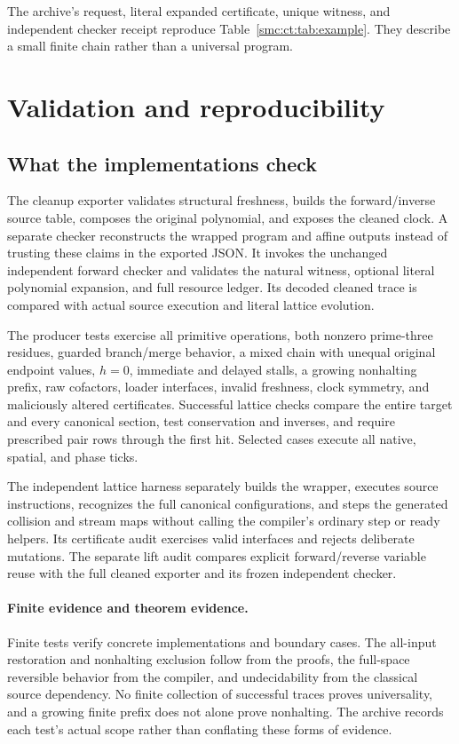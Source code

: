 \documentclass[11pt,letterpaper]{article}
\numberwithin{equation}{section}
\theoremstyle{definition}
\theoremstyle{remark}
\begin{document}
The archive's request, literal expanded certificate, unique witness, and independent checker receipt reproduce Table~\ref{smc:ct:tab:example}. They describe a small finite chain rather than a universal program.

\section{Validation and reproducibility}\label{smc:ct:sec:validation}

\subsection{What the implementations check}

The cleanup exporter validates structural freshness, builds the forward/inverse source table, composes the original polynomial, and exposes the cleaned clock. A separate checker reconstructs the wrapped program and affine outputs instead of trusting these claims in the exported JSON. It invokes the unchanged independent forward checker and validates the natural witness, optional literal polynomial expansion, and full resource ledger. Its decoded cleaned trace is compared with actual source execution and literal lattice evolution.

The producer tests exercise all primitive operations, both nonzero prime-three residues, guarded branch/merge behavior, a mixed chain with unequal original endpoint values, $h=0$, immediate and delayed stalls, a growing nonhalting prefix, raw cofactors, loader interfaces, invalid freshness, clock symmetry, and maliciously altered certificates. Successful lattice checks compare the entire target and every canonical section, test conservation and inverses, and require prescribed pair rows through the first hit. Selected cases execute all native, spatial, and phase ticks.

The independent lattice harness separately builds the wrapper, executes source instructions, recognizes the full canonical configurations, and steps the generated collision and stream maps without calling the compiler's ordinary step or ready helpers. Its certificate audit exercises valid interfaces and rejects deliberate mutations. The separate lift audit compares explicit forward/reverse variable reuse with the full cleaned exporter and its frozen independent checker.

\paragraph{Finite evidence and theorem evidence.}
Finite tests verify concrete implementations and boundary cases. The all-input restoration and nonhalting exclusion follow from the proofs, the full-space reversible behavior from the compiler, and undecidability from the classical source dependency. No finite collection of successful traces proves universality, and a growing finite prefix does not alone prove nonhalting. The archive records each test's actual scope rather than conflating these forms of evidence.
\end{document}
